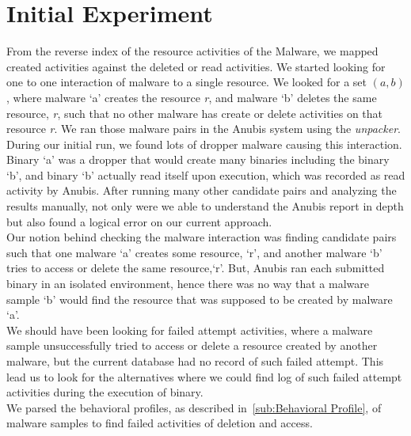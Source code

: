 \section{Initial Experiment}
\label{sec:Initial Experiment}
From the reverse index of the resource activities of the Malware, we mapped created activities against the deleted or read activities.
We started looking for one to one interaction of malware to a single resource.
We looked for a set $(a, b)$, where malware `a' creates the resource \emph{r}, and malware `b' deletes the same resource, \emph{r}, such that no other malware has create or delete activities on that resource \emph{r}. We ran those malware pairs in the Anubis system using the \emph{unpacker}.\\
During our initial run, we found lots of dropper malware causing this interaction. Binary `a' was a dropper that would create many binaries including the binary `b', and binary `b' actually read itself upon execution, which was recorded as read activity by Anubis.
After running many other candidate pairs and analyzing the results manually, not only were we able to understand the Anubis report in depth but also found a logical error on our current approach.\\
Our notion behind checking the malware interaction was finding candidate pairs such that one malware `a' creates some resource, `r', and another malware `b' tries to access or delete the same resource,`r'.
But, Anubis ran each submitted binary in an isolated environment, hence there was no way that a malware sample `b' would find the resource that was supposed to be created by malware `a'.\\
We should have been looking for failed attempt activities, where a malware sample unsuccessfully tried to access or delete a resource created by another malware, but the current database had no record of such failed attempt.
This lead us to look for the alternatives where we could find log of such failed attempt activities during the execution of binary.\\
We parsed the behavioral profiles, as described in~\autoref{sub:Behavioral Profile}, of malware samples to find failed activities of deletion and access.

